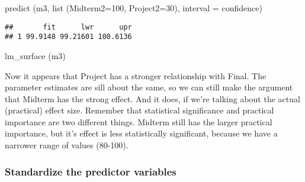 \documentclass[
]{article}
\newenvironment{Shaded}{\begin{snugshade}}{\end{snugshade}}
\newcommand{\AttributeTok}[1]{\textcolor[rgb]{0.77,0.63,0.00}{#1}}
\newcommand{\DecValTok}[1]{\textcolor[rgb]{0.00,0.00,0.81}{#1}}
\newcommand{\FunctionTok}[1]{\textcolor[rgb]{0.00,0.00,0.00}{#1}}
\newcommand{\NormalTok}[1]{#1}
\newcommand{\OtherTok}[1]{\textcolor[rgb]{0.56,0.35,0.01}{#1}}
\newcommand{\SpecialCharTok}[1]{\textcolor[rgb]{0.00,0.00,0.00}{#1}}
\newcommand{\StringTok}[1]{\textcolor[rgb]{0.31,0.60,0.02}{#1}}
\begin{document}
\begin{Shaded}
\begin{Highlighting}[]
\FunctionTok{predict}\NormalTok{ (m3, }\FunctionTok{list}\NormalTok{ (}\AttributeTok{Midterm2=}\DecValTok{100}\NormalTok{, }\AttributeTok{Project2=}\DecValTok{30}\NormalTok{), }\AttributeTok{interval =} \StringTok{\textquotesingle{}confidence\textquotesingle{}}\NormalTok{)}
\end{Highlighting}
\end{Shaded}

\begin{verbatim}
##       fit      lwr      upr
## 1 99.9148 99.21601 100.6136
\end{verbatim}

\begin{Shaded}
\begin{Highlighting}[]
\FunctionTok{lm\_surface}\NormalTok{ (m3)}
\end{Highlighting}
\end{Shaded}

Now it appears that Project has a stronger relationship with Final. The
parameter estimates are sill about the same, so we can still make the
argument that Midterm has the strong effect. And it does, if we're
talking about the actual (practical) effect size. Remember that
statistical significance and practical importance are two different
things. Midterm still has the larger practical importance, but it's
effect is less statistically significant, because we have a narrower
range of values (80-100).

\hypertarget{standardize-the-predictor-variables}{%
\subsubsection{Standardize the predictor
variables}\label{standardize-the-predictor-variables}}

\begin{Shaded}
\end{Shaded}
\end{document}
